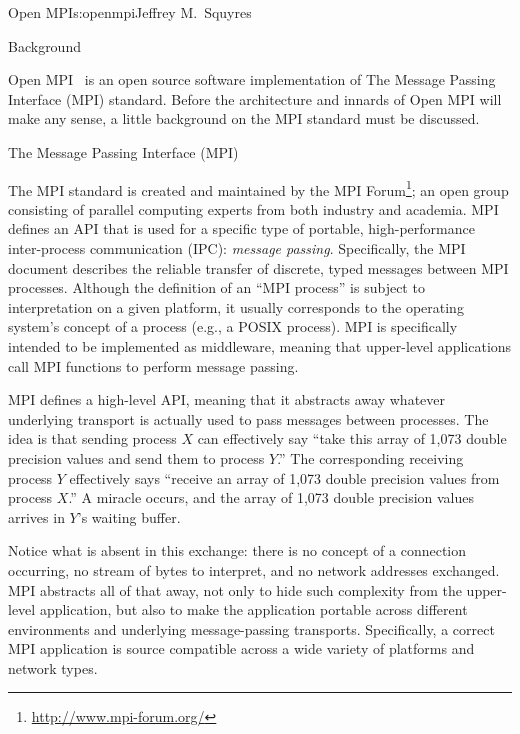 \begin{aosachapter}{Open MPI}{s:openmpi}{Jeffrey M.\ Squyres}

\begin{aosasect1}{Background}

Open MPI~\cite{gabriel04:_open_mpi} is an open source software
implementation of The Message Passing Interface (MPI) standard.
%
Before the architecture and innards of Open MPI will make any sense,
a little background on the MPI standard must be discussed.


\begin{aosasect2}{The Message Passing Interface (MPI)}

The MPI standard is created and maintained by the MPI
Forum\footnote{\url{http://www.mpi-forum.org/}}; an open group
consisting of parallel computing experts from both industry and
academia.
%
MPI defines an API that is used for a specific type of portable,
high-performance inter-process communication (IPC): {\em message
  passing}.  Specifically, the MPI document describes the reliable
transfer of discrete, typed messages between MPI processes.
%
Although the definition of an ``MPI process'' is subject to
interpretation on a given platform, it usually corresponds to the
operating system's concept of a process (e.g., a POSIX process).
%
MPI is specifically intended to be implemented as middleware, meaning
that upper-level applications call MPI functions to perform message
passing.

MPI defines a high-level API, meaning that it abstracts away whatever
underlying transport is actually used to pass messages between
processes.  The idea is that sending process $X$ can effectively say
``take this array of 1,073 double precision values and send them to
process $Y$.''  The corresponding receiving process $Y$ effectively
says ``receive an array of 1,073 double precision values from process
$X$.''  A miracle occurs, and the array of 1,073 double precision
values arrives in $Y$'s waiting buffer.

Notice what is absent in this exchange: there is no concept of a
connection occurring, no stream of bytes to interpret, and no network
addresses exchanged.  MPI abstracts all of that away, not only to hide
such complexity from the upper-level application, but also to make the
application portable across different environments and underlying
message-passing transports.  Specifically, a correct MPI application
is source compatible across a wide variety of platforms and network
types.


\end{aosasect2}
\end{aosasect1}
\end{aosachapter}
